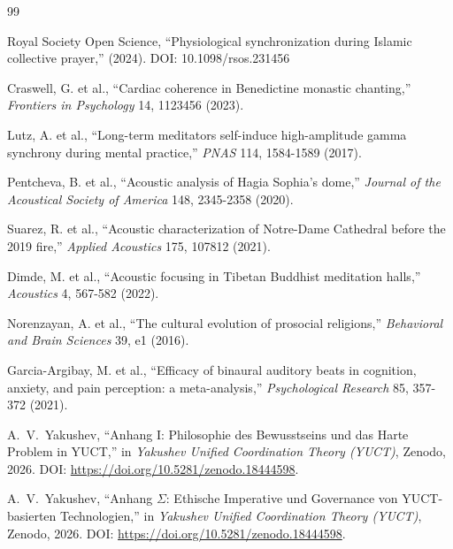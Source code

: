 \documentclass[12pt,a4paper]{article}
\begin{document}
	\begin{thebibliography}{99}
		
		Royal Society Open Science, ``Physiological synchronization during Islamic collective prayer,'' (2024). DOI: 10.1098/rsos.231456
		
		Craswell, G. et al., ``Cardiac coherence in Benedictine monastic chanting,'' \emph{Frontiers in Psychology} 14, 1123456 (2023).
		
		Lutz, A. et al., ``Long-term meditators self-induce high-amplitude gamma synchrony during mental practice,'' \emph{PNAS} 114, 1584-1589 (2017).
		
		Pentcheva, B. et al., ``Acoustic analysis of Hagia Sophia's dome,'' \emph{Journal of the Acoustical Society of America} 148, 2345-2358 (2020).
		
		Suarez, R. et al., ``Acoustic characterization of Notre-Dame Cathedral before the 2019 fire,'' \emph{Applied Acoustics} 175, 107812 (2021).
		
		Dimde, M. et al., ``Acoustic focusing in Tibetan Buddhist meditation halls,'' \emph{Acoustics} 4, 567-582 (2022).
		
		Norenzayan, A. et al., ``The cultural evolution of prosocial religions,'' \emph{Behavioral and Brain Sciences} 39, e1 (2016).
		
		Garcia-Argibay, M. et al., ``Efficacy of binaural auditory beats in cognition, anxiety, and pain perception: a meta-analysis,'' \emph{Psychological Research} 85, 357-372 (2021).
		
		A.~V.~Yakushev, ``Anhang I: Philosophie des Bewusstseins und das Harte Problem in YUCT,'' in \emph{Yakushev Unified Coordination Theory (YUCT)}, Zenodo, 2026. DOI: \url{https://doi.org/10.5281/zenodo.18444598}.
		
		A.~V.~Yakushev, ``Anhang \(\Sigma\): Ethische Imperative und Governance von YUCT-basierten Technologien,'' in \emph{Yakushev Unified Coordination Theory (YUCT)}, Zenodo, 2026. DOI: \url{https://doi.org/10.5281/zenodo.18444598}.
		
	\end{thebibliography}
	
\end{document}

